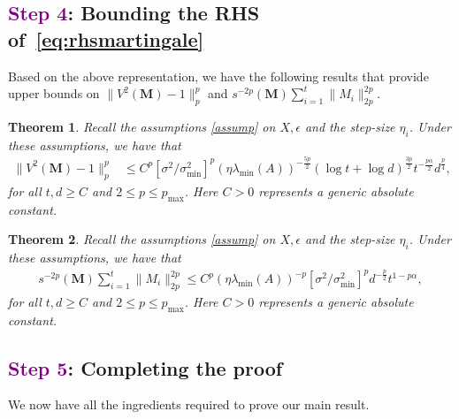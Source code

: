 \documentclass[11pt, reqno,english]{amsart}
\newtheorem{theorem}{Theorem}[section]
\begin{document}

\subsection*{\texorpdfstring{\textcolor{purple}{Step 4}: Bounding the RHS of~\eqref{eq:rhsmartingale}}{Step 4: Bounding the RHS of Eq.~(\ref{eq:rhsmartingale})}}


Based on the above representation, we have the following results that provide upper bounds on $\|V^2(\mathbf{M}) - 1\|_p^p$ and $s^{-2p}(\mathbf{M})\sum_{i = 1}^t\|M_i\|^{2p}_{2p}.$
\begin{theorem}\label{thm:BoundFirstTerm} Recall the assumptions \ref{assump} on $X, \epsilon$ and the step-size $\eta_i$. Under these assumptions, we have that
\begin{align*}
    \|V^2(\mathbf{M}) - 1\|_p^p &\leq C^p[\sigma^2/\sigma^2_{\min}]^p (\eta \lambda_{\min}(A))^{-\frac{5p}{2}}(\log t + \log d)^{\frac{3p}{2}}t^{-\frac{p\alpha}{2}}d^{\frac{p}{4}}, 
\end{align*} 
for all $t,d \geq C$ and $2 \leq p \leq p_{\max}$. Here $C > 0$ represents a generic absolute constant.
\end{theorem}
\begin{theorem}\label{thm:BoundSecondTerm} Recall the assumptions \ref{assump} on $X, \epsilon$ and the step-size $\eta_i$. Under these assumptions, we have that
\begin{align*}
s^{-2p}(\mathbf{M})\sum_{i = 1}^t\|M_i\|^{2p}_{2p} \leq C^p (\eta \lambda_{\min}(A))^{-p}[\sigma^2/\sigma^2_{\min}]^p d^{-\frac{p}{2}}t^{1-p\alpha} ,
\end{align*}
for all $t,d \geq C$ and $2 \leq p \leq p_{\max}$. Here $C > 0$ represents a generic absolute constant.
\end{theorem}


\subsection*{\textcolor{purple}{Step 5}: Completing the proof}
We now have all the ingredients required to prove our main result.
\vspace{0.1in}
\end{document}
